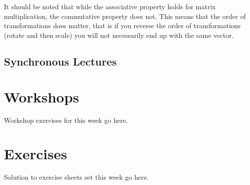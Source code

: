 \documentclass[a4paper,oneside]{report}
\begin{document}
It should be noted that while the associative property holds for matrix
multiplication, the commutative property does not. This means that the order
of transformations does matter, that is if you reverse the order of
transformations (rotate and then scale) you will not necessarily end up with
the same vector.

\subsection{Synchronous Lectures}

\section{Workshops}

Workshop exercises for this week go here.

\section{Exercises}

Solution to exercise sheets set this week go here.
\end{document}
